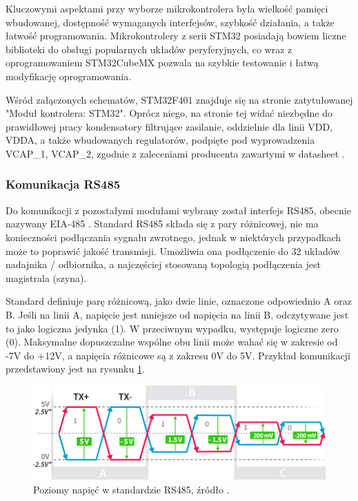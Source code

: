 Kluczowymi aspektami przy wyborze mikrokontrolera była wielkość pamięci wbudowanej, dostępność wymaganych interfejsów, szybkość działania, a także łatwość programowania.
Mikrokontrolery z serii STM32 posiadają bowiem liczne biblioteki do obsługi popularnych układów peryferyjnych, co wraz z oprogramowaniem STM32CubeMX pozwala na szybkie testowanie i łatwą modyfikację oprogramowania.

Wśród załączonych schematów, STM32F401 znajduje się na stronie zatytułowanej "Moduł kontrolera: STM32".
Oprócz niego, na stronie tej widać niezbędne do prawidłowej pracy kondensatory filtrujące zasilanie, oddzielnie dla linii VDD, VDDA, a także wbudowanych regulatorów, podpięte pod wyprowadzenia VCAP\_1, VCAP\_2, zgodnie z zaleceniami producenta
zawartymi w datasheet \cite{stm32f401}.	



\subsubsection{Komunikacja RS485}

Do komunikacji z pozostałymi modułami wybrany został interfejs RS485, obecnie nazywany EIA-485 \cite{RS485}.
Standard RS485 składa się z pary różnicowej, nie ma konieczności podłączania sygnału zwrotnego, jednak w niektórych przypadkach może to poprawić jakość transmisji.
Umożliwia ona podłączenie do 32 układów nadajnika / odbiornika, a najczęściej stosowaną topologią podłączenia jest magistrala (szyna).

Standard definiuje parę różnicową, jako dwie linie, oznaczone odpowiednio A oraz B. Jeśli na linii A, napięcie jest mniejsze od napięcia na linii B, odczytywane jest to jako logiczna jedynka (1). W przeciwnym wypadku, występuje logiczne zero (0).
Maksymalne dopuszczalne wspólne obu linii może wahać się w zakresie od -7V do +12V, a napięcia różnicowe są z zakresu 0V do 5V. Przykład
komunikacji przedstawiony jest na rysunku \ref{fig:poziomyNapiecRS}.

\begin{figure}[h!]
    \begin{center}
        \includegraphics[width = 17cm]{images/rs485_voltages.jpg}
        \caption{Poziomy napięć w standardzie RS485, źródło \cite{napieciaRS}.}
        \label{fig:poziomyNapiecRS}
    \end{center}
\end{figure}


